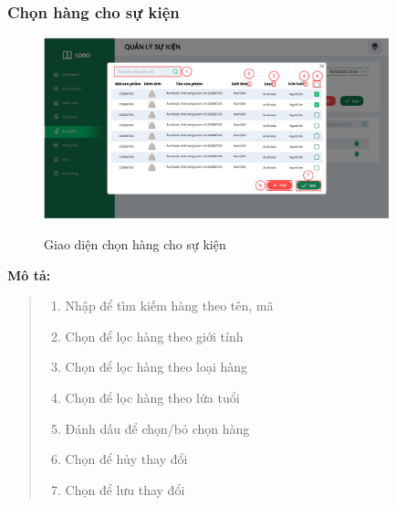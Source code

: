         \subsubsection{Chọn hàng cho sự kiện}
            \begin{figure}[!htp]
                \centering
                \includegraphics[width=10cm]{img/UI/admin/Event_select.png}
                \label{36}
                \newline
                \caption{Giao diện chọn hàng cho sự kiện}
            \end{figure}
            \textbf{Mô tả:}  
            \begin{quote}
                \begin{enumerate}
                    \item Nhập để tìm kiếm hàng theo tên, mã
                    \item Chọn để lọc hàng theo giới tính
                    \item Chọn để lọc hàng theo loại hàng
                    \item Chọn để lọc hàng theo lứa tuổi
                    \item Đánh dấu để chọn/bỏ chọn hàng
                    \item Chọn để hủy thay đổi
                    \item Chọn để lưu thay đổi
                \end{enumerate}
            \end{quote}
    
    
